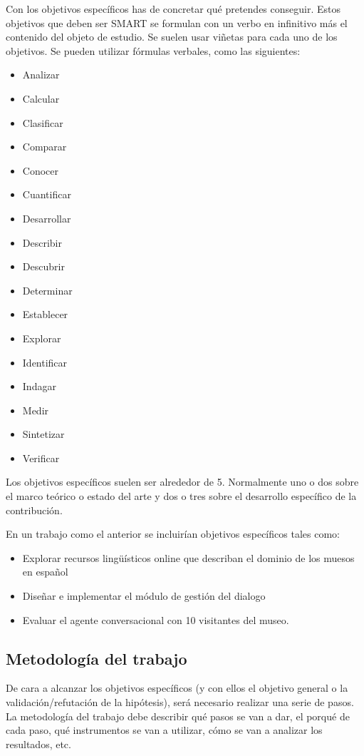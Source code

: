 Con los objetivos específicos has de concretar qué pretendes conseguir.
Estos objetivos que deben ser SMART se formulan con un verbo en infinitivo más el contenido del objeto de estudio.
Se suelen usar viñetas para cada uno de los objetivos.
Se pueden utilizar fórmulas verbales, como las siguientes:
\begin{itemize}
	\item Analizar
	\item Calcular
	\item Clasificar
	\item Comparar
	\item Conocer
	\item Cuantificar
	\item Desarrollar
	\item Describir
	\item Descubrir
	\item Determinar
	\item Establecer
	\item Explorar
	\item Identificar
	\item Indagar
	\item Medir
	\item Sintetizar
	\item Verificar
\end{itemize}

Los objetivos específicos suelen ser alrededor de 5.
Normalmente uno o dos sobre el marco teórico o estado del arte y dos o tres sobre el desarrollo específico de la contribución.

En un trabajo como el anterior se incluirían objetivos específicos tales como:
\begin{itemize}
\item Explorar recursos lingüísticos online que describan el dominio de los muesos en español
\item Diseñar e implementar el módulo de gestión del dialogo
\item Evaluar el agente conversacional con 10 visitantes del museo.
\end{itemize}

\subsection{Metodología del trabajo}

De cara a alcanzar los objetivos específicos (y con ellos el objetivo general o la validación/refutación de la hipótesis), será necesario realizar una serie de pasos.
La metodología del trabajo debe describir qué pasos se van a dar, el porqué de cada paso, qué instrumentos se van a utilizar, cómo se van a analizar los resultados, etc.

\newpage